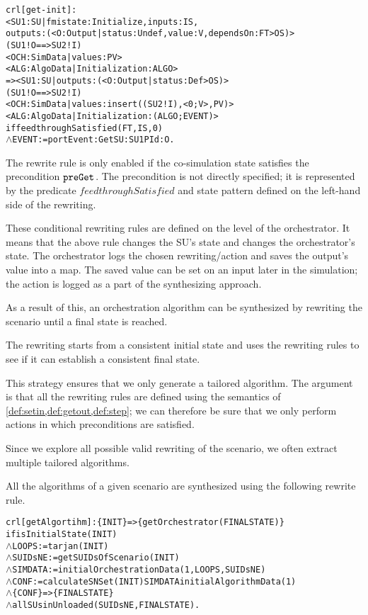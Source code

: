 \begin{alltt}
  \small
  crl [get-init] :
  < SU1 : SU | fmistate : Initialize, inputs : IS, 
    outputs : (< O : Output | status : Undef, value : V, dependsOn : FT > OS) > 
  (SU1 ! O ==> SU2 ! I)
  < OCH : SimData | values : PV > 
  < ALG : AlgoData | Initialization : ALGO >
  => < SU1 : SU | outputs : (< O : Output | status : Def > OS) > 
    (SU1 ! O ==> SU2 ! I)
    < OCH : SimData | values : insert((SU2 ! I), < 0 ; V >, PV) >  
    < ALG : AlgoData | Initialization : (ALGO ; EVENT) >
if feedthroughSatisfied(FT, IS, 0)
  \(\land\) EVENT := portEvent: Get SU: SU1 PId: O . 
\end{alltt}

The rewrite rule is only enabled if the co-simulation state satisfies the precondition $\mathtt{preGet}_{}$.
The precondition is not directly specified; it is represented by the predicate $\mathit{feedthroughSatisfied}$ and state pattern defined on the left-hand side of the rewriting.

These conditional rewriting rules are defined on the level of the orchestrator.
It means that the above rule changes the SU's state and changes the orchestrator's state.
The orchestrator logs the chosen rewriting/action and saves the output's value into a map.
The saved value can be set on an input later in the simulation; the action is logged as a part of the synthesizing approach. 

As a result of this, an orchestration algorithm can be synthesized by rewriting the scenario until a final state is reached. 

The rewriting starts from a consistent initial state and uses the rewriting rules to see if it can establish a consistent final state.

This strategy ensures that we only generate a tailored algorithm. 
The argument is that all the rewriting rules are defined using the semantics of \cref{def:setin,def:getout,def:step}; we can therefore be sure that we only perform actions in which preconditions are satisfied.

Since we explore all possible valid rewriting of the scenario, we often extract multiple tailored algorithms.

All the algorithms of a given scenario are synthesized using the following rewrite rule.
\begin{alltt}
  \small
crl [getAlgortihm]: \{ INIT \} => \{ getOrchestrator(FINALSTATE) \}
if isInitialState(INIT)
  \(\land\) LOOPS := tarjan(INIT)
  \(\land\) SUIDsNE := getSUIDsOfScenario(INIT)
  \(\land\) SIMDATA := initialOrchestrationData(1,LOOPS,SUIDsNE)
  \(\land\) CONF := calculateSNSet(INIT) SIMDATA initialAlgorithmData(1)
  \(\land\) \{CONF\} => \{ FINALSTATE\} 
  \(\land\) allSUsinUnloaded(SUIDsNE, FINALSTATE) .
\end{alltt}

